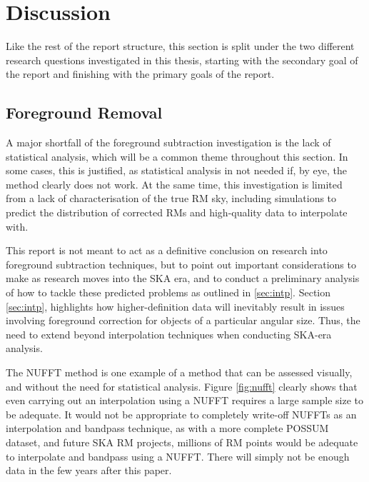 \chapter{Discussion}
\label{cha:discussion}

Like the rest of the report structure, this section is split under the two different research questions investigated in this thesis, starting with the secondary goal of the report and finishing with the primary goals of the report.

\section{Foreground Removal}
\label{sec:fr_disc}

A major shortfall of the foreground subtraction investigation is the lack of statistical analysis, which will be a common theme throughout this section. In some cases, this is justified, as statistical analysis in not needed if, by eye, the method clearly does not work. At the same time, this investigation is limited from a lack of characterisation of the true RM sky, including simulations to predict the distribution of corrected RMs and high-quality data to interpolate with.


This report is not meant to act as a definitive conclusion on research into foreground subtraction techniques, but to point out important considerations to make as research moves into the SKA era, and to conduct a preliminary analysis of how to tackle these predicted problems as outlined in \ref{sec:intp}. Section \ref{sec:intp}, highlights how higher-definition data will inevitably result in issues involving foreground correction for objects of a particular angular size. Thus, the need to extend beyond interpolation techniques when conducting SKA-era analysis.


The NUFFT method is one example of a method that can be assessed visually, and without the need for statistical analysis. Figure \ref{fig:nufft} clearly shows that even carrying out an interpolation using a NUFFT requires a large sample size to be adequate. It would not be appropriate to completely write-off NUFFTs as an interpolation and bandpass technique, as with a more complete POSSUM dataset, and future SKA RM projects, millions of RM points would be adequate to interpolate and bandpass using a NUFFT. There will simply not be enough data in the few years after this paper.


